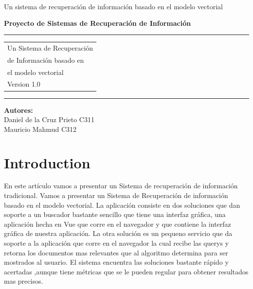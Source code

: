 \documentclass{llncs}
\begin{document}
{Un sistema de recuperaci\'on de informaci\'on basado en el modelo vectorial}
\thispagestyle{empty}
\begin{flushleft}
\LARGE\bfseries Proyecto de Sistemas de Recuperaci\'on de Informaci\'on\\

\end{flushleft}
\rule{\textwidth}{1pt}
\vspace{2pt}
\begin{flushright}
\Huge
\begin{tabular}{@{}l}
 Un Sistema de Recuperaci\'on\\
 de Informaci\'on basado en \\
 el modelo vectorial \\[6pt]
{\Large Version 1.0}
\end{tabular}
\end{flushright}
\rule{\textwidth}{1pt}
\vfill

\begin{flushright}
	\textbf{Autores: }\hspace{5cm}\\
	Daniel de la Cruz Prieto C311 \\
	Mauricio Mahmud C312
\end{flushright}
\author{Daniel de la Cruz Prieto}

\newpage
\tableofcontents
\newpage
%
\section{Introduction}

 En este art\'iculo vamos a presentar un Sistema de recuperaci\'on de informaci\'on tradicional. Vamos a presentar un Sistema de Recuperaci\'on de informaci\'on basado en el modelo vectorial. La aplicaci\'on consiste en dos soluciones que dan soporte a un buscador bastante sencillo que tiene una interfaz gr\'afica, una aplicaci\'on hecha en Vue que corre en el navegador y que contiene la interfaz gr\'afica de nuestra aplicaci\'on. La otra soluci\'on es un pequeno servicio que da soporte a la aplicaci\'on que corre en el navegador la cual recibe las querys y retorna los documentos mas relevantes que al algoritmo determina para ser mostrados al usuario. El sistema encuentra las soluciones bastante r\'apido y acertadas ,aunque tiene m\'etricas que se le pueden regular para obtener resultados mas precisos.
 
\end{document}
